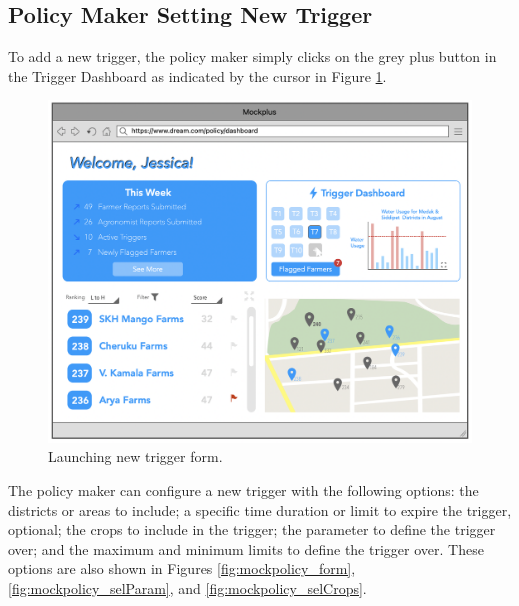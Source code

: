\subsection{Policy Maker Setting New Trigger}
\begin{flushleft}
To add a new trigger, the policy maker simply clicks on the grey plus button in the Trigger Dashboard as indicated by the cursor in Figure \ref{fig:mockpolicy_newtrig}.
\end{flushleft}
\begin{figure}[H]
\centering
\includegraphics[scale=0.4]{../images_diagrams/mock_ups/dd/Trig01_NewTrig.png}
\caption{\label{fig:mockpolicy_newtrig}Launching new trigger form.}
\end{figure}

\begin{flushleft}
The policy maker can configure a new trigger with the following options: the districts or areas to include; a specific time duration or limit to expire the trigger, optional; the crops to include in the trigger; the parameter to define the trigger over; and the maximum and minimum limits to define the trigger over. These options are also shown in Figures \ref{fig:mockpolicy_form}, \ref{fig:mockpolicy_selParam}, and \ref{fig:mockpolicy_selCrops}. 
\end{flushleft}

